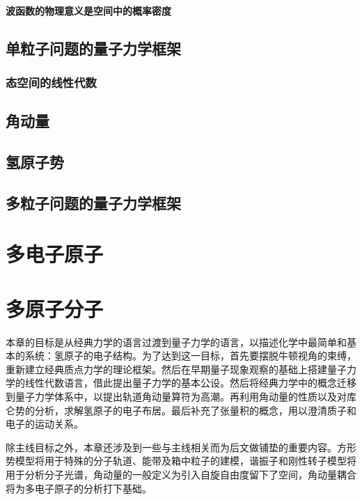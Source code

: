 \documentclass[cn,10pt,math=newtx,citestyle=gb7714-2015,bibstyle=gb7714-2015]{elegantbook}
\begin{document}
\subsubsection{波函数的物理意义是空间中的概率密度}

\section{单粒子问题的量子力学框架}

\subsection{态空间的线性代数}

\section{角动量}

\section{氢原子势}

\section{多粒子问题的量子力学框架}

\chapter{多电子原子}

\chapter{多原子分子}



本章的目标是从经典力学的语言过渡到量子力学的语言，以描述化学中最简单和基本的系统：氢原子的电子结构。为了达到这一目标，首先要摆脱牛顿视角的束缚，重新建立经典质点力学的理论框架。然后在早期量子现象观察的基础上搭建量子力学的线性代数语言，借此提出量子力学的基本公设。然后将经典力学中的概念迁移到量子力学体系中，以提出轨道角动量算符为高潮。再利用角动量的性质以及对库仑势的分析，求解氢原子的电子布居。最后补充了张量积的概念，用以澄清质子和电子的运动关系。

除主线目标之外，本章还涉及到一些与主线相关而为后文做铺垫的重要内容。方形势模型将用于特殊的分子轨道、能带及箱中粒子的建模，谐振子和刚性转子模型将用于分析分子光谱，角动量的一般定义为引入自旋自由度留下了空间，角动量耦合将为多电子原子的分析打下基础。
\end{document}
